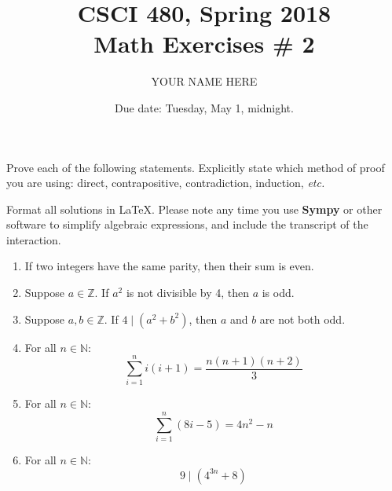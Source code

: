 \documentclass{article}
\title{CSCI 480, Spring 2018\\Math Exercises \# 2}
\author{YOUR NAME HERE}
\date{Due date:  Tuesday, May 1, midnight.}
\newcommand{\nats}{\ensuremath{\mathbb{N}}}
\begin{document}
\maketitle

Prove each of the following statements.  Explicitly state which method
of proof you are using: direct, contrapositive, contradiction,
induction, {\em etc.}

Format all solutions in \LaTeX.
Please note any time you use {\bf Sympy} or
other software to simplify algebraic expressions, and include the
transcript of the interaction.

\begin{enumerate}
\item If two integers have the same parity, then their sum is even.

  
\item Suppose $a\in\mathbb{Z}$.  If $a^2$ is not divisible by 4,
  then $a$ is odd.

\item Suppose $a,b\in\mathbb{Z}$.  If $4\mid (a^2+b^2)$, then $a$ and
  $b$ are not both odd.


\item For all $n\in\nats$:
  \[
 \sum_{i=1}^n i(i+1) = \frac{n(n+1)(n+2)}{3}
  \]
\item For all $n\in\nats$:
  \[
 \sum_{i=1}^n (8i-5) = 4n^2 - n
 \]
\item For all $n\in\nats$:
  \[
  9\mid (4^{3n} + 8)
  \]
\end{enumerate}
\end{document}
